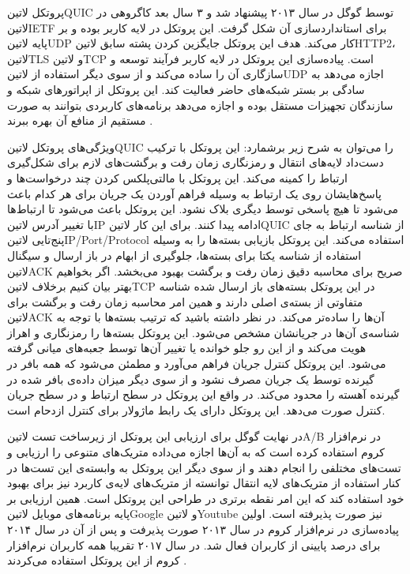 پروتکل ‌لاتین{QUIC} توسط گوگل در سال ۲۰۱۳ پیشنهاد شد و ۳ سال بعد کاگروهی در ‌لاتین{IETF} برای استانداردسازی آن شکل گرفت. این پروتکل در لایه کاربر بوده و بر پایه ‌لاتین{UDP} کار می‌کند.
هدف این پروتکل جایگزین کردن پشته سابق ‌لاتین{HTTP2}، ‌لاتین{TLS} و ‌لاتین{TCP} است.
پیاده‌سازی این پروتکل در لایه کاربر فرآیند توسعه و سازگاری آن را ساده می‌کند و از سوی دیگر استفاده از ‌لاتین{UDP} اجازه می‌دهد به سادگی بر بستر شبکه‌های حاضر فعالیت کند.
این پروتکل از اپراتورهای شبکه و سازندگان تجهیزات مستقل بوده و اجازه می‌دهد برنامه‌های کاربردی بتوانند به صورت مستقیم از منافع آن بهره ببرند
.

ویژگی‌های پروتکل ‌لاتین{QUIC} را می‌توان به شرح زیر برشمارد:
 این پروتکل با ترکیب دست‌داد لایه‌های انتقال و رمزنگاری زمان رفت و برگشت‌های لازم برای شکل‌گیری ارتباط را کمینه می‌کند.
 این پروتکل با مالتی‌پلکس کردن چند درخواست‌ها و پاسخ‌هایشان روی یک ارتباط به وسیله فراهم آوردن یک جریان برای هر کدام باعث می‌شود تا هیچ پاسخی توسط دیگری بلاک نشود.
 این پروتکل باعث می‌شود تا ارتباط‌ها با تغییر آدرس ‌لاتین{IP} ادامه پیدا کنند. برای این کار ‌لاتین{QUIC} از شناسه ارتباط به جای پنج‌تایی ‌لاتین{IP/Port/Protocol} استفاده می‌کند.
 این پروتکل بازیابی بسته‌ها را به وسیله استفاده از شناسه یکتا برای بسته‌ها، جلوگیری از ابهام در باز ارسال و سیگنال ‌لاتین{ACK} صریح برای محاسبه دقیق زمان رفت و برگشت بهبود می‌بخشد. اگر بخواهیم بهتر بیان کنیم برخلاف ‌لاتین{TCP} در این پروتکل
بسته‌های باز ارسال شده شناسه متفاوتی از بسته‌ی اصلی دارند و همین امر محاسبه زمان رفت و برگشت برای ‌لاتین{ACK} آن‌ها را ساده‌تر می‌کند. در نظر داشته باشید که ترتیب بسته‌ها با توجه به شناسه‌ی آن‌ها در جریانشان مشخص می‌شود.
 این پروتکل بسته‌ها را رمزنگاری و اهراز هویت می‌کند و از این رو جلو خوانده یا تغییر آن‌ها توسط جعبه‌های میانی گرفته می‌شود.
 این پروتکل کنترل جریان فراهم می‌آورد و مطمئن می‌شود که همه بافر در گیرنده توسط یک جریان مصرف نشود و از سوی دیگر میزان داده‌ی بافر شده در گیرنده آهسته را محدود می‌کند. در واقع این پروتکل در سطح ارتباط و در سطح جریان کنترل صورت می‌دهد.
 این پروتکل دارای یک رابط ماژولار برای کنترل ازدحام است.

در نهایت گوگل برای ارزیابی این پروتکل از زیرساخت تست ‌لاتین{A/B} در نرم‌افزار کروم استفاده کرده است که به آن‌ها اجازه می‌داده متریک‌های متنوعی را ارزیابی و تست‌های مختلفی را انجام دهند
و از سوی دیگر این پروتکل به وابسته‌ی این تست‌ها در کنار استفاده از متریک‌های لایه انتقال توانسته از متریک‌های لایه‌ی کاربرد نیز برای بهبود خود استفاده کند که این امر نقطه برتری در طراحی این پروتکل است.
همین ارزیابی بر پایه برنامه‌های موبایل ‌لاتین{Google} و ‌لاتین{Youtube} نیز صورت پذیرفته است.
اولین پیاده‌سازی در نرم‌افزار کروم در سال ۲۰۱۳ صورت پذیرفت و پس از آن در سال ۲۰۱۴ برای درصد پایینی از کاربران فعال شد. در سال ۲۰۱۷ تقریبا همه کاربران نرم‌افزار کروم از این پروتکل استفاده می‌کردند
.

